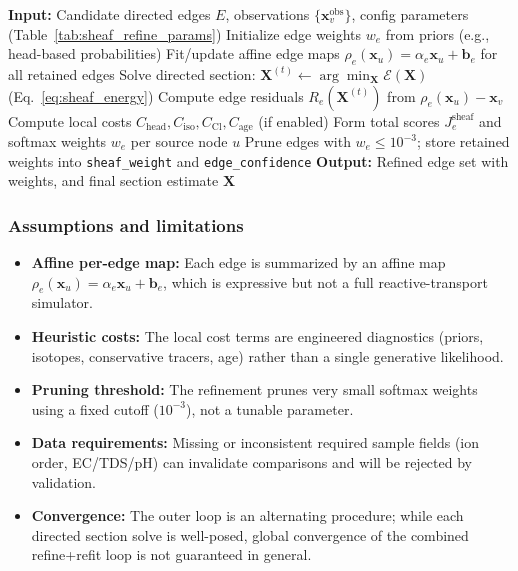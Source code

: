 \documentclass[12pt,a4paper]{article}
\theoremstyle{plain}
\theoremstyle{definition}
\theoremstyle{remark}
\begin{document}
\begin{algorithm}
\caption{Sheaf-consistent edge refinement outer loop}\label{alg:sheaf_refine}
\begin{algorithmic}[1]
\State \textbf{Input:} Candidate directed edges $E$, observations $\{\mathbf{x}_v^{\mathrm{obs}}\}$, config parameters (Table~\ref{tab:sheaf_refine_params})
\State Initialize edge weights $w_e$ from priors (e.g., head-based probabilities)
\State Fit/update affine edge maps $\rho_e(\mathbf{x}_u)=\alpha_e\mathbf{x}_u+\mathbf{b}_e$ for all retained edges
\State Solve directed section: $\mathbf{X}^{(t)} \leftarrow \arg\min_{\mathbf{X}} \mathcal{E}(\mathbf{X})$ (Eq.~\ref{eq:sheaf_energy})
\State Compute edge residuals $R_e(\mathbf{X}^{(t)})$ from $\rho_e(\mathbf{x}_u)-\mathbf{x}_v$
\State Compute local costs $C_{\mathrm{head}},C_{\mathrm{iso}},C_{\mathrm{Cl}},C_{\mathrm{age}}$ (if enabled)
\State Form total scores $J^{\text{sheaf}}_e$ and softmax weights $w_e$ per source node $u$
\State Prune edges with $w_e \le 10^{-3}$; store retained weights into \texttt{sheaf\_weight} and \texttt{edge\_confidence}
\EndFor
\State \textbf{Output:} Refined edge set with weights, and final section estimate $\mathbf{X}$
\end{algorithmic}
\end{algorithm}

\subsubsection{Assumptions and limitations}
\begin{itemize}
	\item \textbf{Affine per-edge map:} Each edge is summarized by an affine map $\rho_e(\mathbf{x}_u)=\alpha_e\mathbf{x}_u+\mathbf{b}_e$, which is expressive but not a full reactive-transport simulator.
	\item \textbf{Heuristic costs:} The local cost terms are engineered diagnostics (priors, isotopes, conservative tracers, age) rather than a single generative likelihood.
	\item \textbf{Pruning threshold:} The refinement prunes very small softmax weights using a fixed cutoff ($10^{-3}$), not a tunable parameter.
	\item \textbf{Data requirements:} Missing or inconsistent required sample fields (ion order, EC/TDS/pH) can invalidate comparisons and will be rejected by validation.
	\item \textbf{Convergence:} The outer loop is an alternating procedure; while each directed section solve is well-posed, global convergence of the combined refine+refit loop is not guaranteed in general.
\end{itemize}
\end{document}
